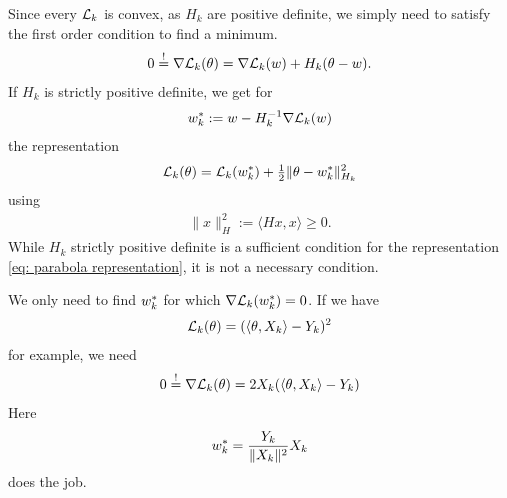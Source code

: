 Since every \(\mathcal{L}_k\) is convex, as \(H_k\) are positive definite, we
simply need to satisfy the first order condition to find a minimum.
\begin{align*}
	0\overset!= \nabla\mathcal{L}_k(\theta)
	= \nabla\mathcal{L}_k(w) + H_k(\theta-w).
\end{align*}
If \(H_k\) is strictly positive definite, we get for
\begin{align*}
	w^*_k := w - H_k^{-1}\nabla\mathcal{L}_k(w)
\end{align*}
the representation
\begin{align}\label{eq: parabola representation}
	\mathcal{L}_k(\theta) = \mathcal{L}_k(w^*_k) + \tfrac12 \|\theta-w^*_k\|_{H_k}^2
\end{align}
using
\begin{align*}
	\|x\|_H^2 := \langle Hx, x\rangle\ge 0.
\end{align*}
While \(H_k\) strictly positive definite is a sufficient condition for the
representation \eqref{eq: parabola representation}, it is not a necessary
condition.
\begin{example}
	We only need to find \(w^*_k\) for which \(\nabla\mathcal{L}_k(w^*_k)=0\).
	If we have
	\begin{align*}
		\mathcal{L}_k(\theta) = (\langle \theta, X_k\rangle - Y_k)^2
	\end{align*}	
	for example, we need
	\begin{align*}
		0\overset!=\nabla\mathcal{L}_k(\theta) = 2X_k (\langle \theta, X_k\rangle - Y_k)
	\end{align*}
	Here
	\begin{align*}
		w^*_k = \frac{Y_k}{\|X_k\|^2}X_k
	\end{align*}
	does the job.
\end{example}

